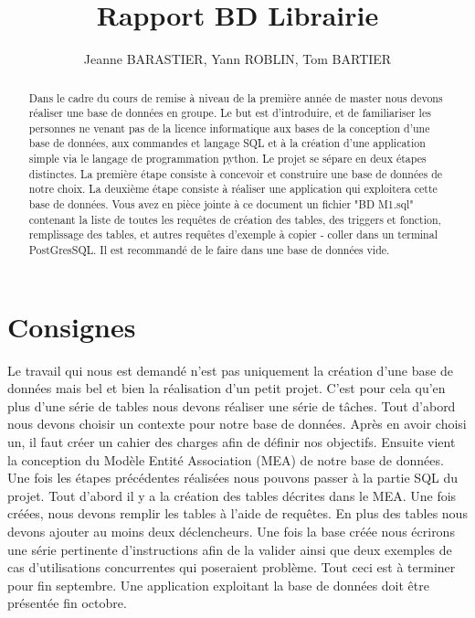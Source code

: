 \documentclass[10pt,a4paper,parskip=full*,DIV=11]{scrartcl}
\title{Rapport BD Librairie}
\author{Jeanne BARASTIER, Yann ROBLIN, Tom BARTIER}
\begin{document}
\maketitle
\begin{abstract}
    Dans le cadre du cours de remise à niveau de la première année de master nous devons réaliser une base de données en groupe. Le but est d’introduire, et de familiariser 
    les personnes ne venant pas de la licence informatique aux bases de la conception d’une base de données, 
    aux commandes et langage SQL et à la création d’une application simple via le langage de programmation python. 
    Le projet se sépare en deux étapes distinctes. La première étape consiste à concevoir et construire une base de 
    données de notre choix. La deuxième étape consiste à réaliser une application qui exploitera cette base de données.
    Vous avez en pièce jointe à ce document un fichier "BD M1.sql" contenant la liste de toutes les requêtes de création des tables, des triggers et fonction, remplissage des tables,
    et autres requêtes d'exemple à copier - coller dans un terminal PostGresSQL. Il est recommandé de le faire dans une base de données vide.
\end{abstract}

\newpage
\tableofcontents
\newpage

\section{Consignes}
Le travail qui nous est demandé n’est pas uniquement la création d’une base de 
données mais bel et bien la réalisation d’un petit projet. C’est pour cela qu’en 
plus d’une série de tables nous devons réaliser une série de tâches. Tout d’abord nous 
devons choisir un contexte pour notre base de données. Après en avoir choisi un, il faut
 créer un cahier des charges afin de définir nos objectifs. Ensuite vient la conception
  du Modèle Entité Association (MEA) de notre base de données. Une fois les étapes 
  précédentes réalisées nous pouvons passer à la partie SQL du projet. Tout d’abord il 
  y a la création des tables décrites dans le MEA. Une fois créées, nous devons remplir
   les tables à l’aide de requêtes. En plus des tables nous devons ajouter au moins deux
    déclencheurs. Une fois la base créée nous écrirons une série pertinente 
    d’instructions afin de la valider ainsi que deux exemples de cas d’utilisations 
    concurrentes qui poseraient problème. Tout ceci est à terminer pour fin septembre. 
Une application exploitant la base de données doit être présentée fin octobre.
\end{document}

